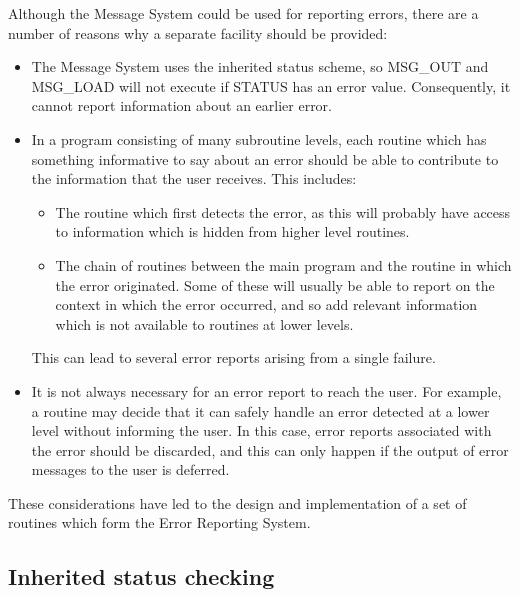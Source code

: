 Although the Message System could be used for reporting errors,
there are a number of reasons why a separate facility should be provided:
\begin {itemize}
\item The Message System uses the inherited status scheme, so MSG\_OUT and
 MSG\_LOAD will not execute if STATUS has an  error value. 
 Consequently, it cannot report information about an earlier error.
\item In a program consisting of many subroutine levels, each routine which
 has something informative to say about an error should be able to contribute
 to the information that the user receives.
 This includes:
\begin {itemize}
\item The routine which first detects the error, as this will probably
 have access to information which is hidden from higher level routines. 
\item The chain of routines between the main program and the routine in
 which the error originated.
 Some of these will usually be able to report on the context in which the error
 occurred, and so add relevant information which is not available to routines 
 at lower levels. 
\end {itemize}
 This can lead to several error reports arising from a single failure. 
\item It is not always necessary for an error report to reach the user. 
 For example, a routine may decide that it can safely handle an error detected
 at a lower level without informing the user. 
 In this case, error reports associated with the error should be discarded, and
 this can only happen if the output of error messages to the  user is deferred. 
\end {itemize}
These considerations have led to the design and implementation of a set of
routines which form the Error Reporting System.

\subsection{Inherited status checking}

